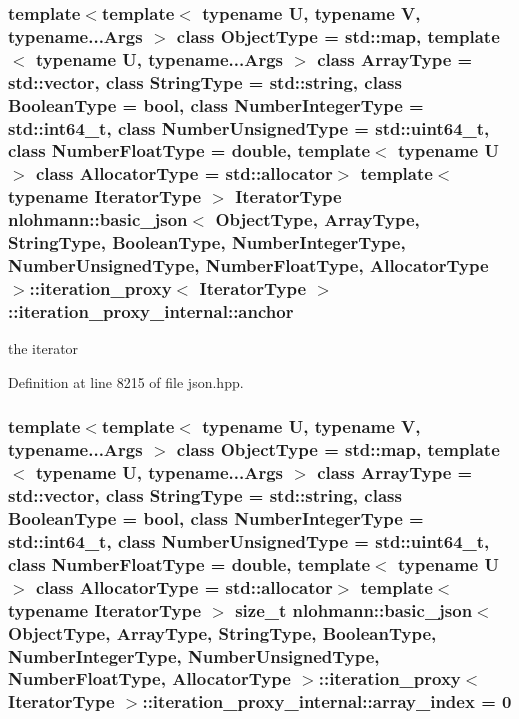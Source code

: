 \subsubsection[{anchor}]{\setlength{\rightskip}{0pt plus 5cm}template$<$template$<$ typename U, typename V, typename...\+Args $>$ class Object\+Type = std\+::map, template$<$ typename U, typename...\+Args $>$ class Array\+Type = std\+::vector, class String\+Type  = std\+::string, class Boolean\+Type  = bool, class Number\+Integer\+Type  = std\+::int64\+\_\+t, class Number\+Unsigned\+Type  = std\+::uint64\+\_\+t, class Number\+Float\+Type  = double, template$<$ typename U $>$ class Allocator\+Type = std\+::allocator$>$ template$<$typename Iterator\+Type $>$ Iterator\+Type {\bf nlohmann\+::basic\+\_\+json}$<$ Object\+Type, Array\+Type, String\+Type, Boolean\+Type, Number\+Integer\+Type, Number\+Unsigned\+Type, Number\+Float\+Type, Allocator\+Type $>$\+::{\bf iteration\+\_\+proxy}$<$ Iterator\+Type $>$\+::iteration\+\_\+proxy\+\_\+internal\+::anchor\hspace{0.3cm}{\ttfamily [private]}}\label{classnlohmann_1_1basic__json_1_1iteration__proxy_1_1iteration__proxy__internal_a7b2f75557da51e1e90de0085e8578217}


the iterator 



Definition at line 8215 of file json.\+hpp.

\hypertarget{classnlohmann_1_1basic__json_1_1iteration__proxy_1_1iteration__proxy__internal_a34fbf864472f7b7f8a7513fe08d87311}{}
\subsubsection[{array\+\_\+index}]{\setlength{\rightskip}{0pt plus 5cm}template$<$template$<$ typename U, typename V, typename...\+Args $>$ class Object\+Type = std\+::map, template$<$ typename U, typename...\+Args $>$ class Array\+Type = std\+::vector, class String\+Type  = std\+::string, class Boolean\+Type  = bool, class Number\+Integer\+Type  = std\+::int64\+\_\+t, class Number\+Unsigned\+Type  = std\+::uint64\+\_\+t, class Number\+Float\+Type  = double, template$<$ typename U $>$ class Allocator\+Type = std\+::allocator$>$ template$<$typename Iterator\+Type $>$ size\+\_\+t {\bf nlohmann\+::basic\+\_\+json}$<$ Object\+Type, Array\+Type, String\+Type, Boolean\+Type, Number\+Integer\+Type, Number\+Unsigned\+Type, Number\+Float\+Type, Allocator\+Type $>$\+::{\bf iteration\+\_\+proxy}$<$ Iterator\+Type $>$\+::iteration\+\_\+proxy\+\_\+internal\+::array\+\_\+index = 0\hspace{0.3cm}{\ttfamily [private]}}\label{classnlohmann_1_1basic__json_1_1iteration__proxy_1_1iteration__proxy__internal_a34fbf864472f7b7f8a7513fe08d87311}


